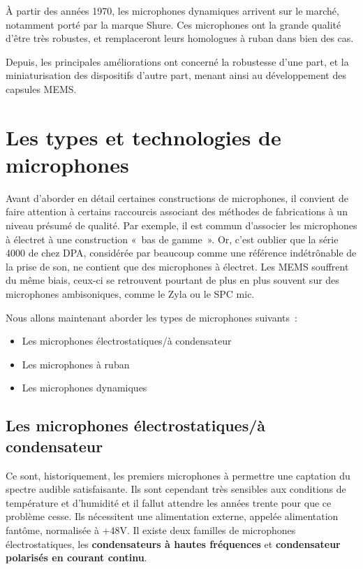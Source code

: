 \documentclass[
]{book}
\providecommand{\tightlist}{%
  \setlength{\itemsep}{0pt}\setlength{\parskip}{0pt}}
\begin{document}
À partir des années 1970, les microphones dynamiques arrivent sur le marché, notamment porté par la marque Shure. Ces microphones ont la grande qualité d'être très robustes, et remplaceront leurs homologues à ruban dans bien des cas.

Depuis, les principales améliorations ont concerné la robustesse d'une part, et la miniaturisation des dispositifs d'autre part, menant ainsi au développement des capsules MEMS.

\hypertarget{les-types-et-technologies-de-microphones}{%
\section{Les types et technologies de microphones}\label{les-types-et-technologies-de-microphones}}

Avant d'aborder en détail certaines constructions de microphones, il convient de faire attention à certains raccourcis associant des méthodes de fabrications à un niveau présumé de qualité. Par exemple, il est commun d'associer les microphones à électret à une construction «~bas de gamme~». Or, c'est oublier que la série 4000 de chez DPA, considérée par beaucoup comme une référence indétrônable de la prise de son, ne contient que des microphones à électret. Les MEMS souffrent du même biais, ceux-ci se retrouvent pourtant de plus en plus souvent sur des microphones ambisoniques, comme le Zyla ou le SPC mic.

Nous allons maintenant aborder les types de microphones suivants~:

\begin{itemize}
\tightlist
\item
  Les microphones électrostatiques/à condensateur
\item
  Les microphones à ruban
\item
  Les microphones dynamiques
\end{itemize}

\hypertarget{les-microphones-uxe9lectrostatiquesuxe0-condensateur}{%
\subsection{Les microphones électrostatiques/à condensateur}\label{les-microphones-uxe9lectrostatiquesuxe0-condensateur}}

Ce sont, historiquement, les premiers microphones à permettre une captation du spectre audible satisfaisante. Ils sont cependant très sensibles aux conditions de température et d'humidité et il fallut attendre les années trente pour que ce problème cesse. Ils nécessitent une alimentation externe, appelée alimentation fantôme, normalisée à +48V. Il existe deux familles de microphones électrostatiques, les \textbf{condensateurs à hautes fréquences} et \textbf{condensateur polarisés en courant continu}.
\end{document}
